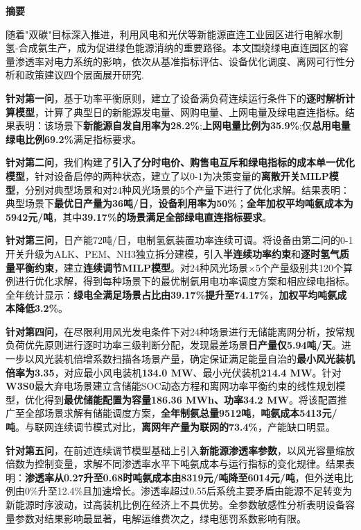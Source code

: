 \documentclass[zihao=-4,a4paper]{ctexart} %
\renewenvironment{abstract}{%
	\begin{center}
		\bfseries \zihao{4} 摘要
	\end{center}
	\small
}{%
	\par
}
\begin{document}
	\begin{abstract}
		
		\normalsize{
			\setlength{\parindent}{2em}
			随着"双碳"目标深入推进，利用风电和光伏等新能源直连工业园区进行电解水制氢-合成氨生产，成为促进绿色能源消纳的重要路径。本文围绕绿电直连园区的容量渗透率对电力系统的影响，依次从基准指标评估、设备优化调度、离网可行性分析和政策建议四个层面展开研究.
			
			\textbf{针对第一问}，基于功率平衡原则，建立了设备满负荷连续运行条件下的\textbf{逐时解析计算模型}，计算了典型日的新能源发电量、网购电量、上网电量及绿电直连指标。结果表明：该场景下\textbf{新能源自发自用率为28.2\%};\textbf{上网电量比例为35.9\%};仅\textbf{总用电量绿电比例69.2\%}满足指标要求。
			
			\textbf{针对第二问}，我们构建了\textbf{引入了分时电价、购售电互斥和绿电指标的成本单一优化模型}，针对设备启停的两种状态，建立了以0-1为决策变量的\textbf{离散开关MILP模型}，分别对典型场景和对24种风光场景的5个产量下进行了优化求解。结果表明：典型场景下\textbf{最优日产量为36吨/日}，\textbf{设备利用率为50\%}；\textbf{全年加权平均吨氨成本为5942元/吨}，其中\textbf{39.17\%的场景满足全部绿电直连指标要求}。
			
			\textbf{针对第三问}，日产能72吨/日，电制氢氨装置功率连续可调。将设备由第二问的0-1开关升级为ALK、PEM、NH3独立拆分建模，引入\textbf{半连续功率约束}和\textbf{逐时氢气质量平衡约束}，建立\textbf{连续调节MILP模型}。对24种风光场景×5个产量级别共120个算例进行优化求解，得到每种场景下的最优制氨用电功率调度方案和相应绿电指标。全年统计显示：\textbf{绿电全满足场景占比由39.17\%提升至74.17\%}，\textbf{加权平均吨氨成本降低3.2\%}。
			
			\textbf{针对第四问}，在尽限利用风光发电条件下对24种场景进行无储能离网分析，按常规负荷优先原则进行逐时功率三级判断分配，发现最差场景\textbf{日产量仅5.94吨/天}。进一步以风光装机倍增系数扫描各场景产量，确定保证满足能量自治的\textbf{最小风光装机倍率为3.35}，对应最小风电装机\textbf{134.0 MW}、最小光伏装机\textbf{214.4 MW}。针对\textbf{W3S0}最大弃电场景建立含储能SOC动态方程和离网功率平衡约束的线性规划模型，优化得到\textbf{最优储能配置为容量186.36 MWh、功率34.2 MW}。将该配置推广至全部场景求解有储能调度方案，\textbf{全年制氨总量9512吨}，\textbf{吨氨成本5413元/吨}。与联网连续调节模式对比，\textbf{离网年产量为联网的73.4\%}，产能缺口明显。
			
			\textbf{针对第五问}，在前述连续调节模型基础上引入\textbf{新能源渗透率参数}，以风光容量缩放倍数为控制变量，求解不同渗透率水平下吨氨成本与运行指标的变化规律。结果表明：\textbf{渗透率从0.27升至0.68时吨氨成本由8319元/吨降至6014元/吨}，但外送电比例由0\%升至12.4\%且加速增长。渗透率超过0.55后系统主要矛盾由能源不足转变为新能源时序波动，过高装机比例在经济上不具优势。全参数敏感性分析表明设备容量参数对结果影响最显著，电解运维费次之，绿电惩罚系数影响有限。
			
		}
	\end{abstract}
	\vspace{0.5cm}
	
\end{document}

